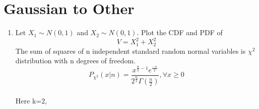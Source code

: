 \documentclass[journal,12pt,twocolumn]{IEEEtran}
\renewcommand\thesection{\arabic{section}}
\begin{document}
		
\section{Gaussian to Other}
\begin{enumerate}[label=\thesection.\arabic*
,ref=\thesection.\theenumi]
\item
Let $X_1 \sim  N(0,1)$ and $X_2 \sim N(0,1)$. Plot the CDF and PDF of \\
%
\begin{equation}
V = X_1^2 + X_2^2
\end{equation}
%
\solution The sum of squares of n independent standard random normal variables is  $\chi^2$ distribution with n degrees of freedom.\\
$$P_{\chi^{2}} (x|n)= \frac{x^{\frac{n}{2} -1} e^{\frac{-x}{2}}}{2^{\frac{n}{2}} \Gamma(
\frac{n}{2})} , \forall x\geq 0$$\\
Here k=2,


\end{enumerate}
\end{document}
